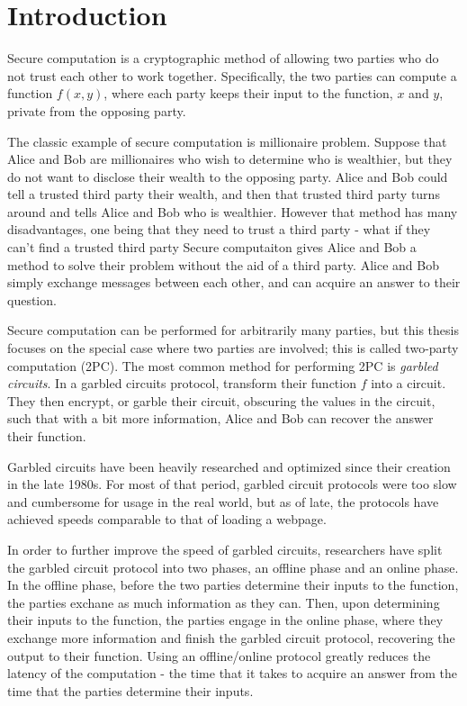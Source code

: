 \chapter*{Introduction}

Secure computation is a cryptographic method of allowing two parties who do not trust each other to work together. 
Specifically, the two parties can compute a function $f(x,y)$, where each party keeps their input to the function, $x$ and $y$, private from the opposing party.

The classic example of secure computation is millionaire problem.
Suppose that Alice and Bob are millionaires who wish to determine who is wealthier, but they do not want to disclose their wealth to the opposing party.
Alice and Bob could tell a trusted third party their wealth, and then that trusted third party turns around and tells Alice and Bob who is wealthier.
However that method has many disadvantages, one being that they need to trust a third party - what if they can't find a trusted third party
Secure computaiton gives Alice and Bob a method to solve their problem without the aid of a third party.
Alice and Bob simply exchange messages between each other, and can acquire an answer to their question.

Secure computation can be performed for arbitrarily many parties, but this thesis focuses on the special case where two parties are involved; this is called two-party computation (2PC).
The most common method for performing 2PC is \textit{garbled circuits}.
In a garbled circuits protocol, transform their function $f$ into a circuit. 
They then encrypt, or garble their circuit, obscuring the values in the circuit, such that with a bit more information, Alice and Bob can recover the answer their function.

Garbled circuits have been heavily researched and optimized since their creation in the late 1980s.
For most of that period, garbled circuit protocols were too slow and cumbersome for usage in the real world, but as of late, the protocols have achieved speeds comparable to that of loading a webpage. 

In order to further improve the speed of garbled circuits, researchers have split the garbled circuit protocol into two phases, an offline phase and an online phase.
In the offline phase, before the two parties determine their inputs to the function, the parties exchane as much information as they can. 
Then, upon determining their inputs to the function, the parties engage in the online phase, where they exchange more information and finish the garbled circuit protocol, recovering the output to their function.
Using an offline/online protocol greatly reduces the latency of the computation - the time that it takes to acquire an answer from the time that the parties determine their inputs.

